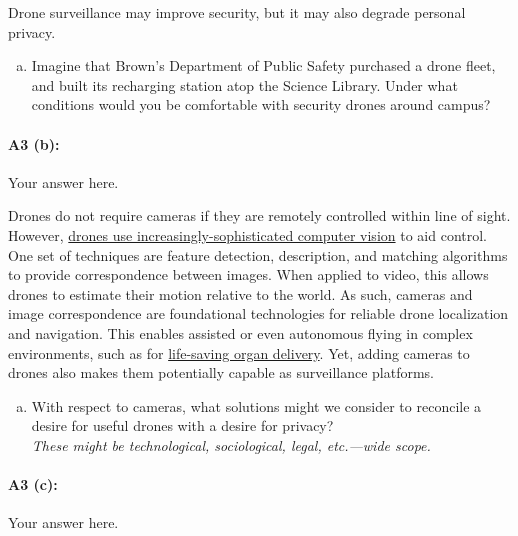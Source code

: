 Drone surveillance may improve security, but it may also degrade personal privacy.

\begin{enumerate}[(b)]
    \item Imagine that Brown's Department of Public Safety purchased a drone fleet, and built its recharging station atop the Science Library. Under what conditions would you be comfortable with security drones around campus?
\end{enumerate}

\paragraph{A3 (b):} Your answer here.




\newpage
Drones do not require cameras if they are remotely controlled within line of sight. However, \href{https://link.springer.com/article/10.1007/s10846-017-0483-z}{drones use increasingly-sophisticated computer vision} to aid control. One set of techniques are feature detection, description, and matching algorithms to provide correspondence between images. When applied to video, this allows drones to estimate their motion relative to the world. As such, cameras and image correspondence are foundational technologies for reliable drone localization and navigation. This enables assisted or even autonomous flying in complex environments, such as for \href{https://www.cnn.com/2019/05/01/health/drone-organ-transplant-bn-trnd/index.html}{life-saving organ delivery}. Yet, adding cameras to drones also makes them potentially capable as surveillance platforms.


\begin{enumerate}[(c)]
    \item With respect to cameras, what solutions might we consider to reconcile a desire for useful drones with a desire for privacy? \\
    \emph{These might be technological, sociological, legal, etc.---wide scope.}
\end{enumerate}

\paragraph{A3 (c):} Your answer here.






